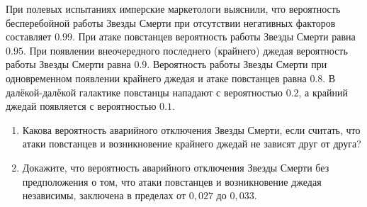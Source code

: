 \begin{problem}

При полевых испытаниях имперские маркетологи выяснили, что вероятность бесперебойной работы Звезды Смерти при отсутствии негативных факторов составляет $0.99$. При атаке повстанцев вероятность работы Звезды Смерти равна $0.95$. При появлении внеочередного последнего (крайнего) джедая вероятность работы Звезды Смерти равна $0.9$.  Вероятность работы Звезды Смерти при одновременном появлении крайнего джедая и атаке повстанцев равна $0.8$.  В далёкой-далёкой галактике повстанцы нападают с вероятностью $0.2$, а крайний джедай появляется с вероятностью $0.1$. 
	
\begin{enumerate}
\item  Какова вероятность аварийного отключения Звезды Смерти, если считать, что атаки повстанцев и возникновение крайнего джедай не зависят друг от друга?
\item  Докажите, что вероятность аварийного отключения Звезды Смерти без предположения о том, что атаки повстанцев и возникновение джедая независимы, заключена в пределах от $0,027$ до $0,033$.
\end{enumerate} 
\end{problem}

